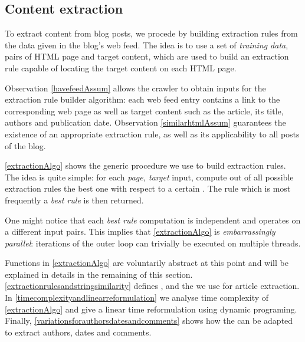 \subsection{Content extraction}
\label{contentextraction}

To extract content from blog posts, we procede by building extraction rules from the data given in the blog's web feed. The idea is to use a set of \emph{training data}, pairs of HTML page and target content, which are used to build an extraction rule capable of locating the target content on each HTML page.

Observation \ref{havefeedAssum} allows the crawler to obtain inputs for the extraction rule builder algorithm: each web feed entry contains a link to the corresponding web page as well as target content such as the article, its title, authors and publication date. Observation \ref{similarhtmlAssum} guarantees the existence of an appropriate extraction rule, as well as its applicability to all posts of the blog.

\autoref{extractionAlgo} shows the generic procedure we use to build extraction rules. The idea is quite simple: for each \code{(}\emph{page, target}\code{)} input, compute out of all possible extraction rules the best one with respect to a certain . The rule which is most frequently a \emph{best rule} is then returned.

\extractionAlgo

One might notice that each \emph{best rule} computation is independent and operates on a different input pairs. This implies that \autoref{extractionAlgo} is \emph{embarrassingly parallel}: iterations of the outer loop can trivially be executed on multiple threads.

Functions in \autoref{extractionAlgo} are voluntarily abstract at this point and will be explained in details in the remaining of this section. \ref{extractionrulesandstringsimilarity} defines ,  and the  we use for article extraction. In \ref{timecomplexityandlinearreformulation} we analyse time complexity of \autoref{extractionAlgo} and give a linear time reformulation using dynamic programing. Finally, \ref{variationsforauthorsdatesandcomments} shows how the  can be adapted to extract authors, dates and comments.

